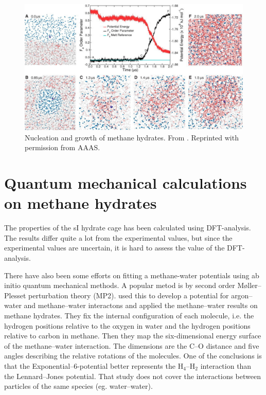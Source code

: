 \begin{figure}
\centering
\includegraphics[width=\textwidth]{../pictures/methane_hydrate_growth.pdf}
\caption{Nucleation and growth of methane hydrates. From \citet{Walsh2009}. Reprinted with permission from AAAS.}
\label{fig:methane_hydrate_growth}
\end{figure}

\section{Quantum mechanical calculations on methane hydrates}
The properties of the sI hydrate cage has been calculated using DFT-analysis. The results differ quite a lot from the experimental values, but since the experimental values are uncertain, it is hard to assess the value of the DFT-analysis.

There have also been some efforts on fitting a methane-water potentials using ab initio quantum mechanical methods. A popular metod is by second order Møller--Plesset perturbation theory (MP2). \citet{Anderson2004} used this to develop a potential for argon--water and methane--water interactons and applied the methane--water results on methane hydrates. They fix the internal configuration of each molecule, i.e. the hydrogen positions relative to the oxygen in water and the hydrogen positions relative to carbon in methane. Then they map the six-dimensional energy surface of the methane--water interaction. The dimensions are the C--O distance and five angles describing the relative rotations of the molecules. One of the conclusions is that the Exponential--6-potential better represents the H$_4$--H$_2$ interaction than the Lennard--Jones potential. That study does not cover the interactions between particles of the same species (eg. water--water).


